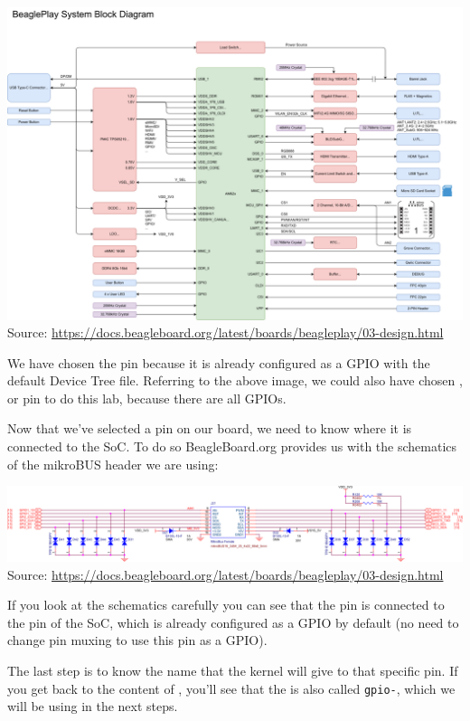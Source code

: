 \includegraphics[width=\textwidth]{labs/sysdev-accessing-hardware-beagleplay/System-Block-Diagram.png}
{\small Source: \url{https://docs.beagleboard.org/latest/boards/beagleplay/03-design.html}}

We have chosen the  pin because it is already configured as
a GPIO with the default Device Tree file. Referring to the above
image, we could also have chosen ,  or 
pin to do this lab, because there are all GPIOs.

Now that we've selected a pin on our board, we need to know where it
is connected to the SoC. To do so BeagleBoard.org provides us with the schematics
of the mikroBUS header we are using:

\includegraphics[width=\textwidth]{labs/sysdev-accessing-hardware-beagleplay/mikroBUS1.png}
{\small Source: \url{https://docs.beagleboard.org/latest/boards/beagleplay/03-design.html}}

If you look at the schematics carefully you can see that the  pin
is connected to the  pin of the SoC, which is already
configured as a GPIO by default (no need to change pin muxing to use
this pin as a GPIO).

The last step is to know the name that the kernel will give
to that specific pin. If you get back to the content of
, you'll see that the 
is also called {\tt gpio-\gpionum}, which we will be using in the next steps.

